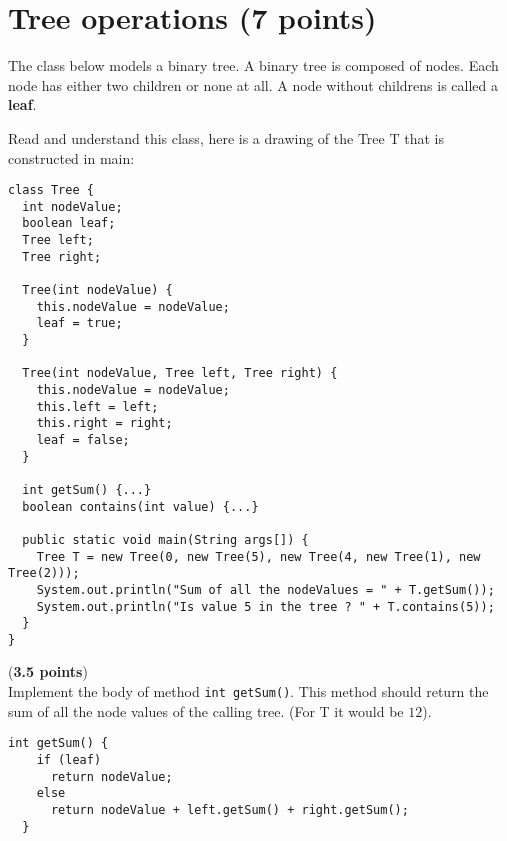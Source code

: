 \documentclass[correction]{exercices}
\begin{document}
\pagebreak
\section{Tree operations (7 points)}

The class below models a binary tree.
A binary tree is composed of nodes.
Each node has either two children or none at all.
A node without childrens is called a \textbf{leaf}.

Read and understand this class,  here is a drawing of the
Tree T that is constructed in main:
\begin{figure}[h]
\end{figure}

\begin{verbatim}
class Tree {
  int nodeValue;
  boolean leaf;
  Tree left;
  Tree right;

  Tree(int nodeValue) {
    this.nodeValue = nodeValue;
    leaf = true;
  }

  Tree(int nodeValue, Tree left, Tree right) {
    this.nodeValue = nodeValue;
    this.left = left;
    this.right = right;
    leaf = false;
  }

  int getSum() {...}
  boolean contains(int value) {...}

  public static void main(String args[]) {
    Tree T = new Tree(0, new Tree(5), new Tree(4, new Tree(1), new Tree(2)));
    System.out.println("Sum of all the nodeValues = " + T.getSum());
    System.out.println("Is value 5 in the tree ? " + T.contains(5));
  }
}
\end{verbatim}

\begin{question} (\textbf{3.5 points})\\
Implement the body of method \lstinline!int getSum()!.
This method should return the sum of all the node values of the calling tree.
(For T it would be $12$).

\begin{correction}
\begin{verbatim}
int getSum() {
    if (leaf)
      return nodeValue;
    else
      return nodeValue + left.getSum() + right.getSum();
  }
\end{verbatim}
\end{correction}
\end{question}
\end{document}
